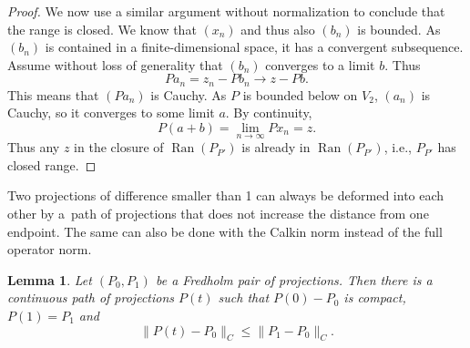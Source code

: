 \documentclass[pdftex]{sigma}
\numberwithin{equation}{section}
\newtheorem{Lemma}[Theorem]{Lemma}
\DeclareMathOperator{\Ran}{Ran}
\begin{document}
\begin{proof}
		We now use a similar argument without normalization to conclude that the range is closed. We know that $(x_n)$ and thus also $(b_n)$ is bounded. As $(b_n)$ is contained in a finite-dimensional space, it has a convergent subsequence. Assume without loss of generality that $(b_n)$ converges to a limit $b$. Thus
		\[Pa_n=z_n-Pb_n\rightarrow z-P b.\]
		This means that $\left(Pa_n\right)$ is Cauchy. As $P$ is bounded below on $V_2$, $(a_n)$ is Cauchy, so it converges to some limit $a$. By continuity,
		\[P(a+b)=\lim\limits_{n\rightarrow\infty} Px_n=z.\]
		Thus any $z$ in the closure of $\Ran(P_{P'})$ is already in $\Ran(P_{P'})$, i.e., $P_{P'}$ has closed range.
	\end{proof}

	Two projections of difference smaller than 1 can always be deformed into each other by a~path of projections that does not increase the distance from one endpoint. The same can also be done with the Calkin norm instead of the full operator norm.
	\begin{Lemma}
		\label{PPath}
		Let $(P_0,P_1)$ be a Fredholm pair of projections. Then there is a continuous path of projections $P(t)$ such that $P(0)-P_0$ is compact, $P(1)=P_1$ and
		\[\|P(t)-P_0\|_C\leq \|P_1-P_0\|_C.\]
	\end{Lemma}
\end{document}
